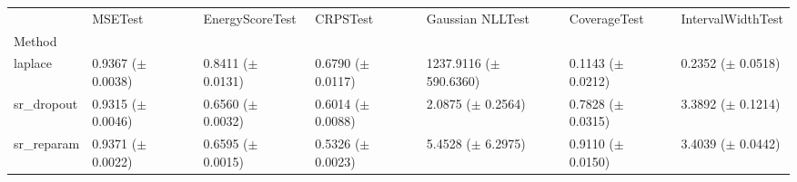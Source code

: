 \begin{tabular}{lllllll}
\toprule
 & MSETest & EnergyScoreTest & CRPSTest & Gaussian NLLTest & CoverageTest & IntervalWidthTest \\
Method &  &  &  &  &  &  \\
\midrule
laplace & \makecell{0.9367 \\ ($\pm$ 0.0038)} & \makecell{0.8411 \\ ($\pm$ 0.0131)} & \makecell{0.6790 \\ ($\pm$ 0.0117)} & \makecell{1237.9116 \\ ($\pm$ 590.6360)} & \makecell{0.1143 \\ ($\pm$ 0.0212)} & \makecell{0.2352 \\ ($\pm$ 0.0518)} \\
sr_dropout & \makecell{0.9315 \\ ($\pm$ 0.0046)} & \makecell{0.6560 \\ ($\pm$ 0.0032)} & \makecell{0.6014 \\ ($\pm$ 0.0088)} & \makecell{2.0875 \\ ($\pm$ 0.2564)} & \makecell{0.7828 \\ ($\pm$ 0.0315)} & \makecell{3.3892 \\ ($\pm$ 0.1214)} \\
sr_reparam & \makecell{0.9371 \\ ($\pm$ 0.0022)} & \makecell{0.6595 \\ ($\pm$ 0.0015)} & \makecell{0.5326 \\ ($\pm$ 0.0023)} & \makecell{5.4528 \\ ($\pm$ 6.2975)} & \makecell{0.9110 \\ ($\pm$ 0.0150)} & \makecell{3.4039 \\ ($\pm$ 0.0442)} \\
\bottomrule
\end{tabular}
